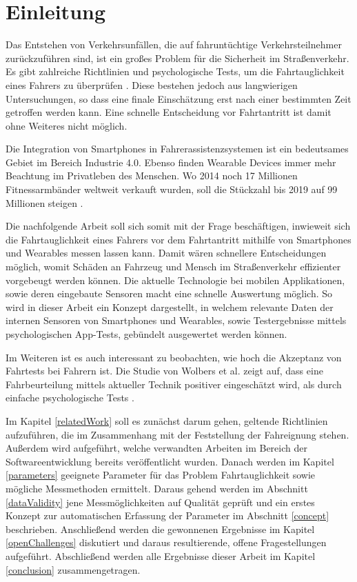 \section{Einleitung}
\label{introduction}

Das Entstehen von Verkehrsunfällen, die auf fahruntüchtige Verkehrsteilnehmer zurückzuführen sind, ist ein großes Problem für die Sicherheit im Straßenverkehr. Es gibt zahlreiche Richtlinien und psychologische Tests, um die Fahrtauglichkeit eines Fahrers zu überprüfen \cite{drivervehiclelicencingagency,testverfahrenpsychometrischefahreignung,begutachtungsrichtlinien,beurteilungskriterien}. Diese bestehen jedoch aus langwierigen Untersuchungen, so dass eine finale Einschätzung erst nach einer bestimmten Zeit getroffen werden kann.  Eine schnelle Entscheidung vor Fahrtantritt ist damit ohne Weiteres nicht möglich.

Die Integration von Smartphones in Fahrerassistenzsystemen ist ein bedeutsames Gebiet im Bereich Industrie 4.0. Ebenso finden Wearable Devices immer mehr Beachtung im Privatleben des Menschen. Wo 2014 noch 17 Millionen Fitnessarmbänder weltweit verkauft wurden, soll die Stückzahl bis 2019 auf 99 Millionen steigen \cite{wearabletracking}. 

Die nachfolgende Arbeit soll sich somit mit der Frage beschäftigen, inwieweit sich die Fahrtauglichkeit eines Fahrers vor dem Fahrtantritt mithilfe von Smartphones und Wearables messen lassen kann. Damit wären schnellere Entscheidungen möglich, womit Schäden an Fahrzeug und Mensch im Straßenverkehr effizienter vorgebeugt werden können. Die aktuelle Technologie bei mobilen Applikationen, sowie deren eingebaute Sensoren macht eine schnelle Auswertung möglich. So wird in dieser Arbeit ein Konzept dargestellt, in welchem relevante Daten der internen Sensoren von Smartphones und Wearables, sowie Testergebnisse mittels psychologischen App-Tests, gebündelt ausgewertet werden können. 

Im Weiteren ist es auch interessant zu beobachten, wie hoch die Akzeptanz von Fahrtests bei Fahrern ist. Die Studie von Wolbers et al. zeigt auf, dass eine Fahrbeurteilung mittels aktueller Technik positiver eingeschätzt wird, als durch einfache psychologische Tests \cite{interaktivefahrsimulation}.

Im Kapitel \ref{relatedWork} soll es zunächst darum gehen, geltende Richtlinien aufzuführen, die im Zusammenhang mit der Feststellung der Fahreignung stehen. Außerdem wird aufgeführt, welche verwandten Arbeiten im Bereich der Softwareentwicklung bereits veröffentlicht wurden. Danach werden im Kapitel \ref{parameters} geeignete Parameter für das Problem Fahrtauglichkeit sowie mögliche Messmethoden ermittelt. Daraus gehend werden im Abschnitt \ref{dataValidity} jene Messmöglichkeiten auf Qualität geprüft und ein erstes Konzept zur automatischen Erfassung der Parameter im Abschnitt \ref{concept} beschrieben. Anschließend werden die gewonnenen Ergebnisse im Kapitel \ref{openChallenges} diskutiert und daraus resultierende, offene Fragestellungen aufgeführt. Abschließend werden alle Ergebnisse dieser Arbeit im Kapitel \ref{conclusion} zusammengetragen.